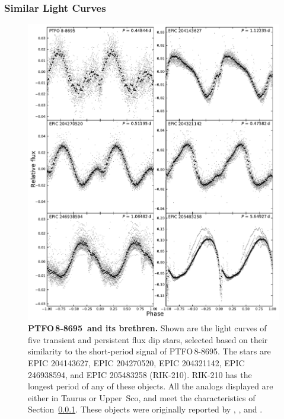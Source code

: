 \documentclass[12pt,twocolumn,tighten]{aastex62}
\newcommand{\ptfo}{PTFO$\,$8-8695}
\begin{document}
\subsubsection{Similar Light Curves}
\label{subsec:dipstars}

\begin{figure}[hbtp]
	\begin{center}
		\leavevmode
		\includegraphics[width=1\textwidth]{f7.pdf}
	\end{center}
	\vspace{-0.7cm}
  \caption{ {\bf \ptfo\ and its brethren.}
    Shown are the light curves of five transient and persistent flux
    dip stars, selected based on their similarity to the short-period
    signal of \ptfo.  The stars are EPIC 204143627, EPIC 204270520,
    EPIC 204321142, EPIC 246938594, and EPIC 205483258 (RIK-210).
    RIK-210 has the longest period of any of these objects.  All the
    analogs displayed are either in Taurus or Upper~Sco, and meet the
    characteristics of Section~\ref{subsec:dipstars}.  These objects
    were originally reported by \citet{stauffer_orbiting_2017},
    \citet{david_transient_2017}, and \citet{rebull_usco_2018}.
		\label{fig:brethren}
	}
\end{figure}
\end{document}
